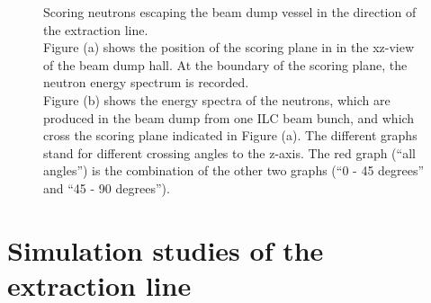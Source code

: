 \begin{figure}[hbp]
\caption[Neutron scoring plane in the main beam dump hall]{Scoring neutrons escaping the beam dump vessel in the direction of the extraction line.
\\Figure (a) shows the position of the scoring plane in \fluka in the xz-view of the beam dump hall.
At the boundary of the scoring plane, the neutron energy spectrum is recorded.
\\Figure (b) shows the energy spectra of the neutrons, which are produced in the beam dump \designone from one ILC beam bunch, and which cross the scoring plane indicated in Figure (a).
The different graphs stand for different crossing angles to the z-axis.
The red graph (``all angles'') is the combination of the other two graphs (``0 - 45 degrees'' and ``45 - 90 degrees'').}
\label{fig:BeamDumps:NeutronScoring}
\end{figure}

\clearpage
\section{Simulation studies of the extraction line}
\label{BeamDumps:sim_EXT}

